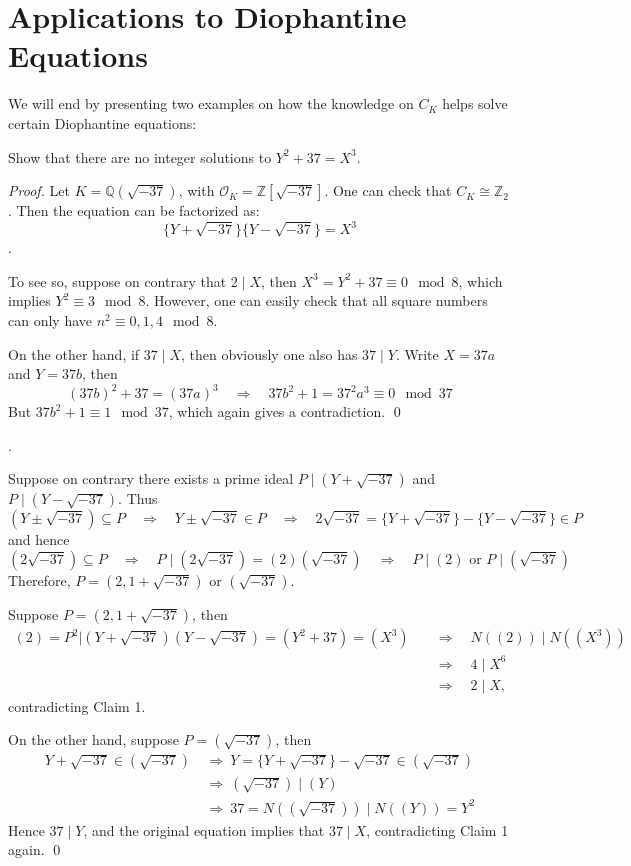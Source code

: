 \section{Applications to Diophantine Equations}
We will end by presenting two examples on how the knowledge on $C_K$ helps solve certain Diophantine equations:
\begin{example}
Show that there are no integer solutions to $Y^2+37 = X^3$.
\end{example}
\begin{proof}
Let $K = \mathbb{Q}(\sqrt{-37})$, with $\mathcal{O}_K = \mathbb{Z}[\sqrt{-37}]$. One can check that $C_K \cong \mathbb{Z}_2$. Then the equation can be factorized as:
$$\{Y + \sqrt{-37}\}\{Y - \sqrt{-37}\} = X^3$$
. 

To see so, suppose on contrary that $2 \mid X$, then $X^3 = Y^2 + 37 \equiv 0 \mod 8$, which implies $Y^2 \equiv 3 \mod 8$. However, one can easily check that all square numbers can only have $n^2 \equiv 0, 1, 4 \mod8 $.

On the other hand, if $37 \mid X$, then obviously one also has $37 \mid Y$. Write $X = 37a$ and $Y = 37b$, then
$$(37b)^2 + 37 = (37a)^3 \quad \Rightarrow \quad 37b^2 + 1 = 37^2a^3 \equiv 0 \mod 37$$
But $37b^2 + 1 \equiv 1 \mod 37$, which again gives a contradiction. \qed

\medskip 
{}. 

Suppose on contrary there exists a prime ideal $P \mid (Y + \sqrt{-37})$ and $ P \mid (Y - \sqrt{-37})$. Thus 
$$(Y \pm \sqrt{-37}) \subseteq P \quad \Rightarrow  \quad Y \pm \sqrt{-37} \in P  \quad \Rightarrow  \quad 2\sqrt{-37} = \{Y + \sqrt{-37}\} - \{Y - \sqrt{-37}\} \in P$$  
and hence
$$(2\sqrt{-37}) \subseteq P  \quad
\Rightarrow  \quad P \mid (2\sqrt{-37}) = (2)(\sqrt{-37})  \quad \Rightarrow  \quad P \mid (2) \text{ or } P \mid (\sqrt{-37})$$
Therefore, $P = (2, 1+ \sqrt{-37})$ or $(\sqrt{-37})$. 

Suppose $P = (2, 1+ \sqrt{-37})$, then 
\begin{align*}
(2) = P^2 | (Y+\sqrt{-37})(Y-\sqrt{-37}) = (Y^2+37) = (X^3) \quad &\Rightarrow \quad N((2)) \mid N((X^3)) \\
&\Rightarrow \quad  4 \mid X^6 \\ &\Rightarrow \quad 2 \mid X,\end{align*}
contradicting Claim 1.

On the other hand, suppose $P = (\sqrt{-37})$, then
\begin{align*}
Y + \sqrt{-37} \in (\sqrt{-37}) \ &\Rightarrow \ Y = \{Y + \sqrt{-37}\} - \sqrt{-37} \in (\sqrt{-37}) \\ &\Rightarrow \ (\sqrt{-37}) \mid (Y) \\
&\Rightarrow \  37 = N((\sqrt{-37})) \mid N((Y)) = Y^2 
\end{align*}
Hence $37 \mid Y$, and the original equation implies that $37 \mid X$, contradicting Claim 1 again.  \qed


\end{proof}
